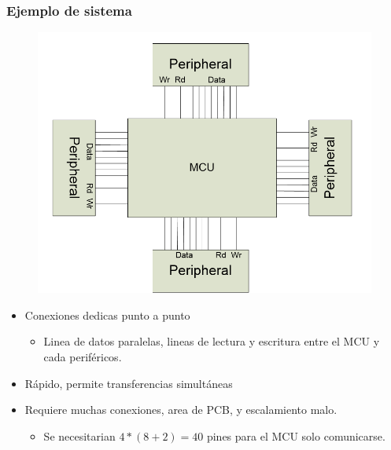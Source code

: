 \documentclass[10.5pt,scale=1.0,t,aspectratio=169,hyperref={pdfpagelabels=false}]{beamer}
\begin{document}
\begin{frame}
	\frametitle{Ejemplo de sistema}
		
	\begin{figure}
		\centering
		\includegraphics[scale=0.35]{02_Example1}
	\end{figure}
	
	\begin{itemize}
		\item Conexiones dedicas punto a punto
		\begin{itemize}
			\item Linea de datos paralelas, lineas de lectura y escritura entre el MCU y cada periféricos.
		\end{itemize}
		\item Rápido, permite transferencias simultáneas
		\item Requiere muchas conexiones, area de PCB, y escalamiento malo.
		\begin{itemize}
			\item Se necesitarian $4*(8+2)=40$ pines para el MCU solo comunicarse. 	
		\end{itemize}
	\end{itemize}

\end{frame}
\end{document}
